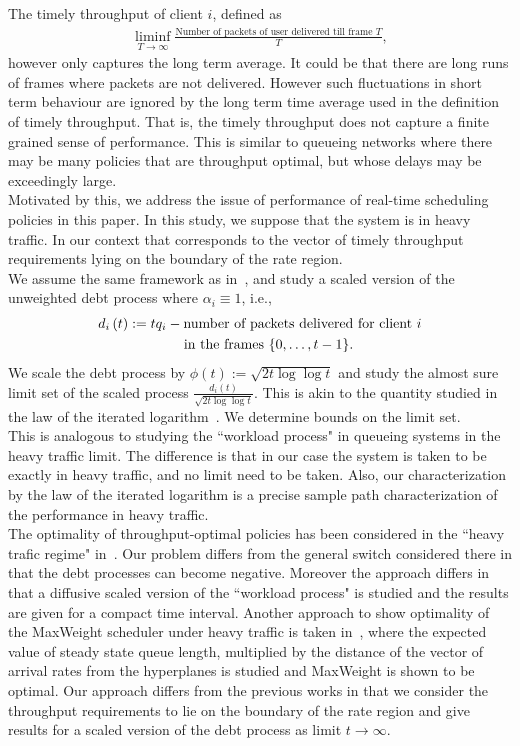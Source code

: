 \documentclass[letterpaper, 10 pt, conference]{ieeeconf}
\begin{document}
The timely throughput of client $i$, defined as 
\begin{align*}
\liminf_{T\to\infty}\frac{\mbox{Number of packets of user delivered till frame $T$}}{T}, 
\end{align*}
however only captures the long term average. It could be that there are long runs of frames where packets are not delivered. However such fluctuations in short term behaviour are ignored by the long term time average used in the definition of timely throughput. That is, the timely throughput does not capture a finite grained sense of performance. This is similar to queueing networks where there may be many policies that are throughput optimal, but whose delays may be exceedingly large.\\
Motivated by this, we address the issue of performance of real-time scheduling policies in this paper. In this study, we suppose that the system is in heavy traffic. In our context that corresponds to the vector of timely throughput requirements lying on the boundary of the rate region.\\
We assume the same framework as in~\cite{c3}, and study a scaled version of the unweighted debt process where $\alpha_{i}\equiv 1$, i.e.,
\begin{align}
d_{i}\left(t\right) &:= tq_{i} -\mbox{number of packets delivered for client $i$} \notag\\
&\qquad \qquad \mbox{in the frames $\left\{0,\ldots,t-1\right\}$}.
\end{align}
We scale the debt process by $\phi\left(t\right):=\sqrt{2t\log\log t}$ and study the almost sure limit set of the scaled process $\frac{d_{i}\left(t\right)}{\sqrt{2t\log\log t}}$. This is akin to the quantity studied in the law of the iterated logarithm~\cite{c5}. We determine bounds on the limit set.  \\
This is analogous to studying the ``workload process" in queueing systems in the heavy traffic limit. The difference is that in our case the system is taken to be exactly in heavy traffic, and no limit need to be taken. Also, our characterization by the law of the iterated logarithm is a precise sample path characterization of the performance in heavy traffic.\\
The optimality of throughput-optimal policies has been considered in the ``heavy trafic regime" in~\cite{c1,c2}. Our problem differs from the general switch considered there in that the debt processes can become negative. Moreover the approach differs in that a diffusive scaled version of the ``workload process" is studied and the results are given for a compact time interval. Another approach to show optimality of the MaxWeight scheduler under heavy traffic is taken in~\cite{c2}, where the expected value of steady state queue length, multiplied by the distance of the vector of arrival rates from the hyperplanes is studied and MaxWeight is shown to be optimal. Our approach differs from the previous works in that we consider the throughput requirements to lie on the boundary of the rate region and give results for a scaled version of the debt process  as limit $t\to\infty$.
\end{document}
